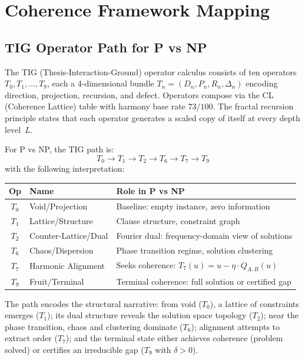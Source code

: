 \documentclass[11pt]{article}
\theoremstyle{definition}
\theoremstyle{remark}
\begin{document}
\section{Coherence Framework Mapping}
\label{sec:coherence}

\subsection{TIG Operator Path for P vs NP}

The TIG (Thesis-Interaction-Ground) operator calculus consists of ten
operators $T_0, T_1, \ldots, T_9$, each a 4-dimensional bundle
$T_n = (D_n, P_n, R_n, \Delta_n)$ encoding direction, projection,
recursion, and defect.  Operators compose via the CL (Coherence Lattice)
table with harmony base rate $73/100$.  The fractal recursion principle
states that each operator generates a scaled copy of itself at every
depth level~$L$.

For P vs NP, the TIG path is:
\[
  T_0 \to T_1 \to T_2 \to T_6 \to T_7 \to T_9
\]
with the following interpretation:

\begin{center}
\begin{tabular}{@{}cll@{}}
\toprule
\textbf{Op} & \textbf{Name} & \textbf{Role in P vs NP} \\
\midrule
$T_0$ & Void/Projection & Baseline: empty instance, zero information \\
$T_1$ & Lattice/Structure & Clause structure, constraint graph \\
$T_2$ & Counter-Lattice/Dual & Fourier dual: frequency-domain view of solutions \\
$T_6$ & Chaos/Dispersion & Phase transition regime, solution clustering \\
$T_7$ & Harmonic Alignment & Seeks coherence: $T_7(u) = u - \eta \cdot Q_{A,B}(u)$ \\
$T_9$ & Fruit/Terminal & Terminal coherence: full solution or certified gap \\
\bottomrule
\end{tabular}
\end{center}

The path encodes the structural narrative: from void ($T_0$), a lattice
of constraints emerges ($T_1$); its dual structure reveals the solution
space topology ($T_2$); near the phase transition, chaos and clustering
dominate ($T_6$); alignment attempts to extract order ($T_7$); and the
terminal state either achieves coherence (problem solved) or certifies
an irreducible gap ($T_9$ with $\delta > 0$).
\end{document}
